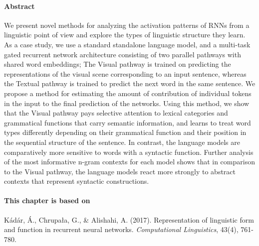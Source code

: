 \paragraph{Abstract}
  We present novel methods for analyzing the activation patterns of
  RNNs from a linguistic point of view and explore the types of
  linguistic structure they learn. As a case study, we use a standard
  standalone language model, and a multi-task gated
  recurrent network architecture consisting of two parallel pathways with
  shared word embeddings; The {\sc Visual} pathway is trained on predicting the
  representations of the visual scene corresponding to an input
  sentence, whereas the {\sc Textual} pathway is trained to predict the
  next word in the same sentence.
  We propose a method for estimating the amount of contribution
  of individual tokens in the input to the final prediction of the networks.
  Using this method, we show that the {\sc Visual} pathway pays
  selective attention to lexical categories and grammatical functions
  that carry semantic information, and learns to treat word types
  differently depending on their grammatical function and their position
  in the sequential structure of the sentence. In contrast, the language
  models are comparatively more sensitive to words with a syntactic
  function. Further analysis of the most informative n-gram contexts for
  each model shows that in comparison to the {\sc Visual} pathway,
  the language models react more strongly to abstract contexts
  that represent syntactic constructions.

\newpage

\paragraph{This chapter is based on} Kádár, Á., Chrupała, G., \& Alishahi, A. (2017).
Representation of linguistic form and function in recurrent neural networks. \textit{Computational Linguistics}, 
43(4), 761-780.

\newpage







%
%

%
